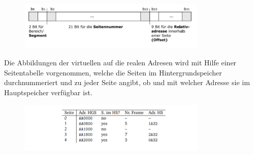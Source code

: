 \documentclass{article}
\begin{document}
    \begin{figure}[H]
        \centering
	    \includegraphics[width=90mm]{Skizzen/3_Kapitel/programmadresse.png}
    \end{figure}\newline
    Die Abbildungen der virtuellen auf die realen Adresen wird mit Hilfe einer Seitentabelle vorgenommen, welche die Seiten im Hintergrundspeicher durchnummeriert und zu jeder Seite angibt, ob und mit welcher Adresse sie im Hauptspeicher verfügbar ist.
    \begin{figure}[H]
        \centering
	    \includegraphics[width=90mm]{Skizzen/3_Kapitel/seitentabellen.png}
    \end{figure}
\end{document}
